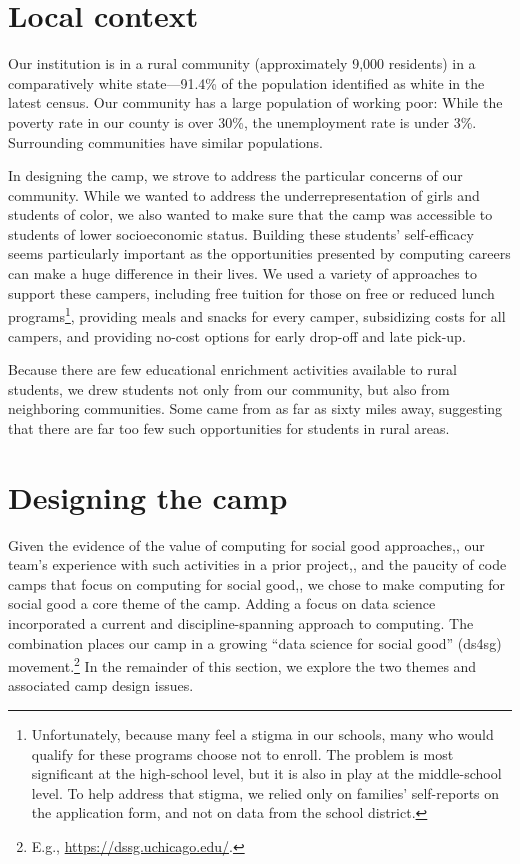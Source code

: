 \section{Local context}

Our institution is in a rural community (approximately 9,000
residents) in a comparatively white state---91.4\% of the population identified as white
in the latest census.  Our community has a large population of
working poor: While the poverty rate in our county is over 30\%,
the unemployment rate is under 3\%.  Surrounding communities have
similar populations.

In designing the camp, we strove to address the particular concerns
of our community.  While we wanted to address the underrepresentation
of girls and students of color, we also wanted to make sure that
the camp was accessible to students of lower socioeconomic status.
Building these students' self-efficacy seems particularly important
as the opportunities presented by computing careers can make a huge
difference in their lives.  We used a variety of approaches to
support these campers, including free tuition for those on free
or reduced lunch programs\footnote{Unfortunately, because many feel
a stigma in our schools, many who would qualify for these
programs choose not to enroll.  The problem is most significant at
the high-school level, but it is also in play at the
middle-school level.  To help address that stigma, we relied only
on families' self-reports on the application form, and not on data
from the school district.}, providing meals and snacks for every
camper, subsidizing costs for all campers, and providing no-cost
options for early drop-off and late pick-up.

Because there are few educational enrichment activities available
to rural students, we drew students not only from our community,
but also from neighboring communities.  Some came from as far as
sixty miles away, suggesting that there are far too few such
opportunities for students in rural areas.

\section{Designing the camp}

Given the evidence of the value of computing for social good
approaches,\cite{Goldweber2013,Goldweber2018}, our team's experience
with such activities in a prior project,\cite{arts-coding}, and the
paucity of code camps that focus on computing for social
good,\cite{DeWitt2017}, we chose to make
computing for social good a core theme of the camp.  
Adding a focus on data science incorporated a current and
discipline-spanning approach to computing.
The combination places our camp in a growing
``data science for social good'' (ds4sg) movement.\footnote{E.g.,
\url{https://dssg.uchicago.edu/}.}  
In the remainder of this section, we explore the two themes and
associated camp design issues.

